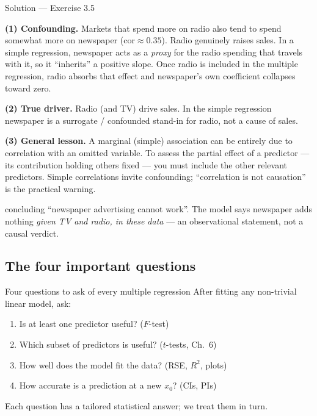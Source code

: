 \documentclass[aspectratio=169,11pt]{beamer}
\begin{document}
\begin{frame}{Solution --- Exercise 3.5}
  \begin{solutionbox}
    \textbf{(1) Confounding.} Markets that spend more on radio also tend
    to spend somewhat more on newspaper ($\mathrm{cor}\approx 0.35$).
    Radio genuinely raises sales. In a simple regression, newspaper acts
    as a \emph{proxy} for the radio spending that travels with it, so it
    ``inherits'' a positive slope. Once radio is included in the multiple
    regression, radio absorbs that effect and newspaper's own
    coefficient collapses toward zero.

    \textbf{(2) True driver.} Radio (and TV) drive sales. In the simple
    regression newspaper is a surrogate / confounded stand-in for radio,
    not a cause of sales.

    \textbf{(3) General lesson.} A marginal (simple) association can be
    entirely due to correlation with an omitted variable. To assess the
    partial effect of a predictor --- its contribution holding others
    fixed --- you must include the other relevant predictors. Simple
    correlations invite confounding; ``correlation is not causation'' is
    the practical warning.
  \end{solutionbox}
  \begin{mistake}
    concluding ``newspaper advertising cannot
    work''. The model says newspaper adds nothing \emph{given TV and
    radio, in these data} --- an observational statement, not a causal
    verdict.
  \end{mistake}
\end{frame}

\subsection{The four important questions}

\begin{frame}{Four questions to ask of every multiple regression}
  After fitting any non-trivial linear model, ask:
  \begin{enumerate}
    \item Is at least one predictor useful? \hfill ($F$-test)
    \item Which subset of predictors is useful? \hfill ($t$-tests, Ch.~6)
    \item How well does the model fit the data? \hfill (RSE, $R^2$, plots)
    \item How accurate is a prediction at a new $x_0$? \hfill (CIs, PIs)
  \end{enumerate}
  Each question has a tailored statistical answer; we treat them in
  turn.
\end{frame}
\end{document}
